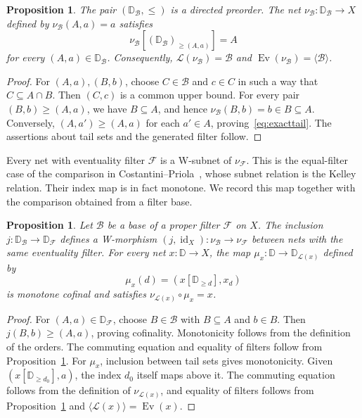 \documentclass[11pt,a4paper]{article}
\newtheorem{proposition}[theorem]{Proposition}
\theoremstyle{definition}
\theoremstyle{remark}
\newcommand{\FF}{\mathcal F}
\newcommand{\BB}{\mathcal B}
\newcommand{\Ev}{\operatorname{Ev}}
\newcommand{\Tail}{\mathcal L}
\newcommand{\id}{\operatorname{id}}
\begin{document}
\begin{proposition}\label{prop:base}
The pair \((\mathbb{D}_{\BB},\le)\) is a directed preorder. The net \(\nu_{\BB}:\mathbb{D}_{\BB}\to X\)
defined by \(\nu_{\BB}(A,a)=a\) satisfies
\begin{equation}\label{eq:exacttail}
 \nu_{\BB}[(\mathbb{D}_{\BB})_{\ge(A,a)}]=A
\end{equation}
for every \((A,a)\in\mathbb{D}_{\BB}\). Consequently,
\(\Tail(\nu_{\BB})=\BB\) and
\(\Ev(\nu_{\BB})=\langle\BB\rangle\).
\end{proposition}
\begin{proof}
For \((A,a),(B,b)\), choose \(C\in\BB\) and \(c\in C\)
in such a way that \(C\subseteq A\cap B\). Then \((C,c)\)
is a common upper bound. For every pair \((B,b)\ge(A,a)\),
we have \(B\subseteq A\), and hence
\(\nu_{\BB}(B,b)=b\in B\subseteq A\). Conversely,
\((A,a')\ge(A,a)\) for each \(a'\in A\), proving~\eqref{eq:exacttail}.
The assertions about tail sets and the generated filter follow.
\end{proof}

Every net with eventuality filter \(\FF\) is a W-subnet of
\(\nu_{\FF}\).
This is the equal-filter case of the comparison in
Costantini--Priola~\cite[Proposition 3.1]{CP}, whose subnet relation
is the Kelley relation. Their index map is in fact monotone.
We record this map together with the comparison obtained from a
filter base.

\begin{proposition}\label{prop:basecomparison}
Let \(\BB\) be a base of a proper filter \(\FF\) on \(X\).
The inclusion \(j:\mathbb{D}_{\BB}\to\mathbb{D}_{\FF}\) defines
a W-morphism \((j,\id_X):\nu_{\BB}\to\nu_{\FF}\) between nets
with the same eventuality filter. For every net
\(x:\mathbb{D}\to X\), the map
\(\mu_x:\mathbb{D}\to\mathbb{D}_{\Tail(x)}\) defined by
\[
 \mu_x(d)=(x[\mathbb{D}_{\ge d}],x_d)
\]
is monotone cofinal and satisfies
\(\nu_{\Tail(x)}\circ\mu_x=x\).
\end{proposition}
\begin{proof}
For \((A,a)\in \mathbb{D}_{\FF}\), choose \(B\in\BB\) with \(B\subseteq A\)
and \(b\in B\). Then \(j(B,b)\ge(A,a)\), proving cofinality.
Monotonicity follows from the definition of the orders. The commuting
equation and equality of filters follow from
Proposition~\ref{prop:base}.
For \(\mu_x\), inclusion between tail sets gives monotonicity. Given
\((x[\mathbb{D}_{\ge d_0}],a)\), the index \(d_0\) itself maps above it.
The commuting equation follows from the definition of \(\nu_{\Tail(x)}\),
and equality of filters follows from Proposition~\ref{prop:base} and
\(\langle\Tail(x)\rangle=\Ev(x)\).
\end{proof}
\end{document}

